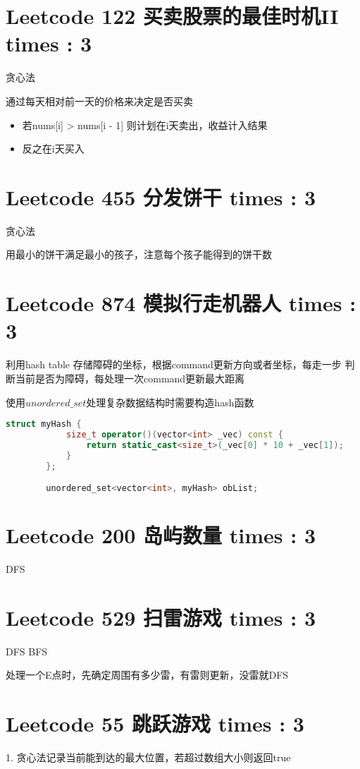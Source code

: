 \documentclass[UTF8]{ctexart}
\begin{document}
\section{Leetcode 122 买卖股票的最佳时机II times : 3}
贪心法

通过每天相对前一天的价格来决定是否买卖
\begin{itemize}
	\item 若nums[i] > nums[i - 1] 则计划在i天卖出，收益计入结果
	\item 反之在i天买入
\end{itemize}

\section{Leetcode 455 分发饼干 times : 3}
贪心法

用最小的饼干满足最小的孩子，注意每个孩子能得到的饼干数

\section{Leetcode 874 模拟行走机器人 times : 3}
利用hash table 存储障碍的坐标，根据command更新方向或者坐标，每走一步
判断当前是否为障碍，每处理一次command更新最大距离

使用$unordered\_set$处理复杂数据结构时需要构造hash函数
\begin{framed}
	\begin{lstlisting}[language=C++]
		struct myHash {
			size_t operator()(vector<int> _vec) const {
				return static_cast<size_t>(_vec[0] * 10 + _vec[1]);
			}
		};

		unordered_set<vector<int>, myHash> obList;
	\end{lstlisting}
\end{framed}

\section{Leetcode 200 岛屿数量 times : 3}
DFS

\section{Leetcode 529 扫雷游戏 times : 3}
DFS BFS

处理一个E点时，先确定周围有多少雷，有雷则更新，没雷就DFS

\section{Leetcode 55 跳跃游戏 times : 3}
1. 贪心法记录当前能到达的最大位置，若超过数组大小则返回true
\end{document}
